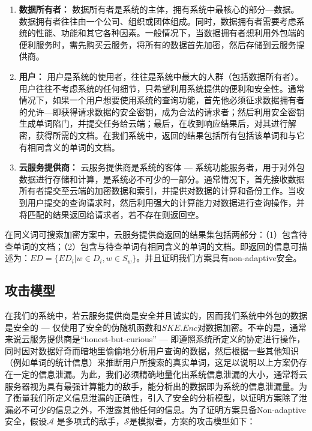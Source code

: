 \begin{enumerate}
  \item
  \textbf{数据所有者：} 数据所有者是系统的主体，拥有系统中最核心的部分---数据。数据拥有者往往由一个公司、组织或团体组成。同时，数据拥有者需要考虑系统的性能、功能和其它各种因素。一般情况下，当数据拥有者想利用外包端的便利服务时，需先购买云服务，将所有的数据首先加密，然后存储到云服务提供商。



  \item
  \textbf{用户：} 用户是系统的使用者，往往是系统中最大的人群（包括数据所有者）。用户往往不考虑系统的任何细节，只希望利用系统提供的便利和安全性。通常情况下，如果一个用户想要使用系统的查询功能，首先他必须征求数据拥有者的允许---即获得请求数据的安全密钥，成为合法的请求者；然后利用安全密钥生成单词陷门，并提交任务给云端；最后，在收到响应结果后，对其进行解密，获得所需的文档。在我们系统中，返回的结果包括所有包括该单词和与它有相同含义的单词的文档。



  \item
  \textbf{云服务提供商：} 云服务提供商是系统的客体 --- 系统功能服务者，用于对外包数据进行存储和计算，是系统必不可少的一部分。通常情况下，首先接收数据所有者提交至云端的加密数据和索引，并提供对数据的计算和备份工作。当收到用户提交的查询请求时，然后利用强大的计算能力对数据进行查询操作，并将匹配的结果返回给请求者，若不存在则返回空。
\end{enumerate}

在同义词可搜索加密方案中，云服务提供商返回的结果集包括两部分：（1）包含待查单词的文档；（2）包含与待查单词有相同含义的单词的文档。即返回的信息可描述为：$ED = \{ ED_i | w \in D_i, w \in S_w \}$。并且证明我们方案具有non-adaptive安全。


\subsection{攻击模型}
\label{sec:synonym_model_attack_model}

在我们的系统中，若云服务提供商是安全并且诚实的，因而我们系统中外包的数据是安全的 --- 仅使用了安全的伪随机函数和$SKE.Enc$对数据加密。不幸的是，通常来说云服务提供商是“honest-but-curious” --- 即遵照系统所定义的协定进行操作，同时因对数据好奇而暗地里偷偷地分析用户查询的数据，然后根据一些其他知识（例如单词的统计信息）来推断用户所搜索的真实单词，这足以说明以上方案仍存在一定的信息泄漏。为此，我们必须精确地量化出系统信息泄漏的大小，通常将云服务器视为具有最强计算能力的敌手，能分析出的数据即为系统的信息泄漏量。为了衡量我们所定义信息泄漏的正确性，引入了安全的分析模型，以证明方案除了泄漏必不可少的信息之外，不泄露其他任何的信息。为了证明方案具备Non-adaptive安全，假设$\mathcal{A}$ 是多项式的敌手，$\mathcal{S}$是模拟者，方案的攻击模型如下：


